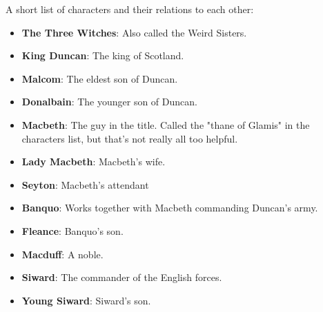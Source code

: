 A short list of characters and their relations to each other:

\begin{itemize}
    \item \textbf{The Three Witches}: Also called the Weird Sisters.
    \item \textbf{King Duncan}: The king of Scotland.
    \item \textbf{Malcom}: The eldest son of Duncan.
    \item \textbf{Donalbain}: The younger son of Duncan.

    \item \textbf{Macbeth}: The guy in the title. Called the "thane of Glamis"
        in the characters list, but that's not really all too helpful.
    \item \textbf{Lady Macbeth}: Macbeth's wife.
    \item \textbf{Seyton}: Macbeth's attendant

    \item \textbf{Banquo}: Works together with Macbeth commanding Duncan's
        army.
    \item \textbf{Fleance}: Banquo's son.
    \item \textbf{Macduff}: A noble.

    \item \textbf{Siward}: The commander of the English forces.
    \item \textbf{Young Siward}: Siward's son.
\end{itemize}
